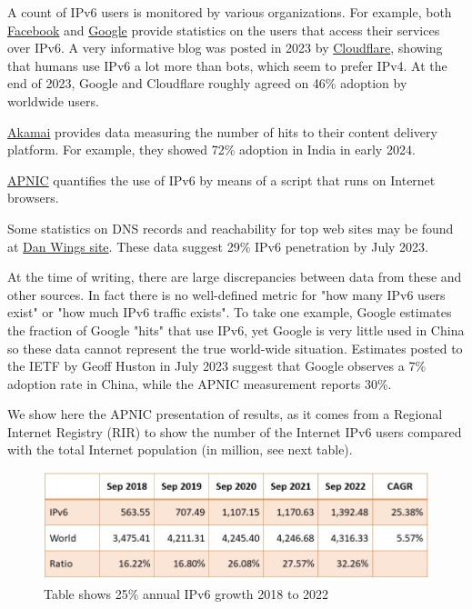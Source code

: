 \documentclass[
]{article}
\begin{document}
A count of IPv6 users is monitored by various organizations. For
example, both
\href{https://www.facebook.com/ipv6/?tab=ipv6_total_adoption}{Facebook}
and \href{https://www.google.com/intl/en/ipv6/statistics.html}{Google}
provide statistics on the users that access their services over IPv6. A
very informative blog was posted in 2023 by
\href{https://blog.cloudflare.com/ipv6-from-dns-pov}{Cloudflare},
showing that humans use IPv6 a lot more than bots, which seem to prefer
IPv4. At the end of 2023, Google and Cloudflare roughly agreed on 46\%
adoption by worldwide users.

\href{https://www.akamai.com/internet-station/cyber-attacks/state-of-the-internet-report/ipv6-adoption-visualization}{Akamai}
provides data measuring the number of hits to their content delivery
platform. For example, they showed 72\% adoption in India in early 2024.

\href{https://stats.labs.apnic.net/ipv6}{APNIC} quantifies the use of
IPv6 by means of a script that runs on Internet browsers.

Some statistics on DNS records and reachability for top web sites may be
found at \href{https://www.employees.org/~dwing/aaaa-stats/}{Dan
Wing\textquotesingle s site}. These data suggest 29\% IPv6 penetration
by July 2023.

At the time of writing, there are large discrepancies between data from
these and other sources. In fact there is no well-defined metric for
"how many IPv6 users exist" or "how much IPv6 traffic exists". To take
one example, Google estimates the fraction of Google "hits" that use
IPv6, yet Google is very little used in China so these data cannot
represent the true world-wide situation. Estimates posted to the IETF by
Geoff Huston in July 2023 suggest that Google observes a 7\% adoption
rate in China, while the APNIC measurement reports 30\%.

We show here the APNIC presentation of results, as it comes from a
Regional Internet Registry (RIR) to show the number of the Internet IPv6
users compared with the total Internet population (in million, see next
table).

\begin{figure}
\centering
\includegraphics{Section5_Table1.jpg}
\caption{Table shows 25\% annual IPv6 growth 2018 to 2022}
\end{figure}
\end{document}
